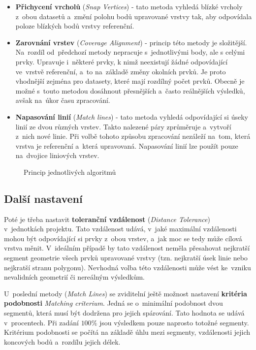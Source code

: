 \begin{itemize}
 \item \textbf{Přichycení vrcholů} (\textit{Snap Vertices}) - tato metoda vyhledá 
	blízké vrcholy z~obou datasetů a~změní polohu bodů upravované vrstvy tak, 
	aby odpovídala poloze blízkých bodů vrstvy referenční.
 \item \textbf{Zarovnání vrstev} (\textit{Coverage Alignment}) - princip této 
	metody je složitější. Na~rozdíl od~předchozí metody nepracuje s~jednotlivými
	body, ale s celými prvky. Upravuje i~ně\-které prvky, k nimž neexistují 
	žádné odpovídající ve~vrstvě refe\-renční, a~to na~základě změny okolních 
	prvků. Je proto vhodnější zejména pro datasety, které mají rozdílný počet
	prvků. Obecně je možné s~touto metodou dosáhnout přesnějších a~často
	reálnějších výsledků, avšak na~úkor času zpraco\-vání.
 \item \textbf{Napasování linií} (\textit{Match lines}) - tato metoda vyhledá
	odpovídající si úseky linií ze dvou různých vrstev. Takto nalezené
	páry zprůměruje a~vytvoří z~nich nové linie. Při volbě tohoto způsobu
	zpracování nezáleží na~tom, která vrstva je referenční a~která upravovaná.
	Napasování linií lze použít pouze na~dvojice liniových vrstev.
\end{itemize}

  \begin{figure}[H]
    \centering
      \def\svgwidth{400pt}
      
      \caption{Princip jednotlivých algoritmů}
      \label{fig:algorithms}
  \end{figure}

\subsection{Další nastavení}
Poté je třeba nastavit \textbf{toleranční vzdálenost} (\textit{Distance 
Tolerance}) v~jednotkách projektu. Tato vzdálenost udává, v~jaké maximální 
vzdálenosti mohou být odpovídající si prvky z~obou vrstev, a~jak moc se 
tedy může cílová vrstva měnit. V~ideálním případě by tato vzdálenost 
neměla přesahovat nejkratší segment geometrie všech prvků upravované vrstvy 
(tzn. nejkratší úsek linie nebo nejkratší stranu polygonu). Nevhodná volba této 
vzdálenosti může vést ke~vzniku nevalidních geometrií či nereálným výsledkům.

U~poslední metody (\textit{Match Lines}) se zviditelní ještě možnost nastavení
\textbf{kritéria podobnosti} \textit{Matching criterium}. Jedná se o~minimální 
podobnost dvou segmentů, která musí být dodržena pro jejich spárování. 
Tato hodnota se udává v~procentech. Při zadání $100 \%$ jsou výsledkem pouze 
naprosto totožné segmenty. Kritérium podobnosti se počítá na základě úhlu mezi 
segmenty, vzdálenosti jejich koncových bodů a~rozdílu jejich délek. 

